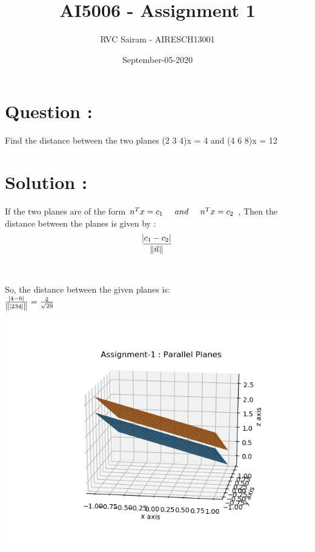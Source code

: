 \documentclass{article}
\title{AI5006 - Assignment 1}
\author{RVC Sairam - AIRESCH13001 }
\date{September-05-2020}
\begin{document}
\maketitle
\section*{Question :}
\large{Find the distance between the two planes
(2 3 4)x = 4 and (4 6 8)x = 12}
\section*{Solution :}
\large{If the two planes are of the form \( n^T x = c_1 \hspace{0.5cm}and \hspace{0.5cm} n^T x = c_2 \) , Then the distance between the planes is given by : }\\

\[\frac{\abs{c_1-c_2}}{\norm{\vec{n}}}\] \\ \\

\large{So, the distance between the given planes is: }\\

\large{\(\frac{\abs{4 - 6}}{\norm {[2 3 4]}}    =   \frac{2}{\sqrt{29}}\)  } 

\begin{center}
    \includegraphics[width = .6\textwidth]{parallel planes.png}
\end{center}
\end{document}

